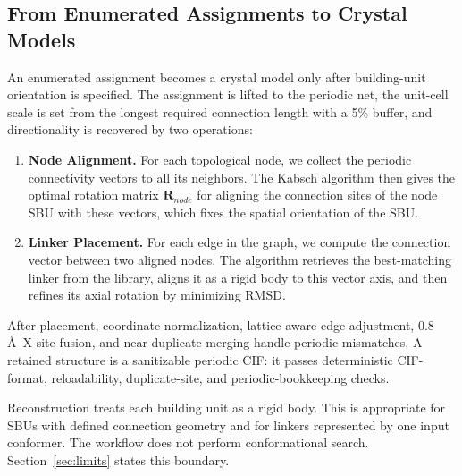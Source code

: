 \documentclass[pdflatex,sn-mathphys-num]{sn-jnl}
\theoremstyle{thmstyleone}%
\begin{document}
\subsection*{From Enumerated Assignments to Crystal Models}
An enumerated assignment becomes a crystal model only after building-unit orientation is specified. The assignment is lifted to the periodic net, the unit-cell scale is set from the longest required connection length with a 5\% buffer, and directionality is recovered by two operations:

\begin{enumerate}
\item \textbf{Node Alignment.} For each topological node, we collect the periodic connectivity vectors to all its neighbors.
The Kabsch algorithm then gives the optimal rotation matrix $\mathbf{R}_{node}$ for aligning the connection sites of the node SBU with these vectors, which fixes the spatial orientation of the SBU.

\item \textbf{Linker Placement.} For each edge in the graph, we compute the connection vector between two aligned nodes.
The algorithm retrieves the best-matching linker from the library, aligns it as a rigid body to this vector axis, and then refines its axial rotation by minimizing RMSD.
\end{enumerate}


After placement, coordinate normalization, lattice-aware edge adjustment, 0.8\,\AA\ X-site fusion, and near-duplicate merging handle periodic mismatches. A retained structure is a sanitizable periodic CIF: it passes deterministic CIF-format, reloadability, duplicate-site, and periodic-bookkeeping checks.

Reconstruction treats each building unit as a rigid body. This is appropriate for SBUs with defined connection geometry and for linkers represented by one input conformer. The workflow does not perform conformational search. Section~\ref{sec:limits} states this boundary.
\end{document}
